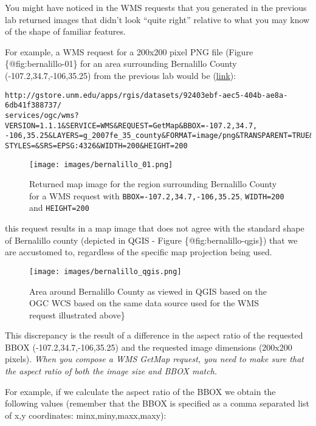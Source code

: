 \documentclass[]{book}
\begin{document}
You might have noticed in the WMS requests that you generated in the
previous lab returned images that didn't look ``quite right'' relative
to what you may know of the shape of familiar features.

For example, a WMS request for a 200x200 pixel PNG file (Figure
\{@fig:bernalillo-01\} for an area surrounding Bernalillo County
(-107.2,34.7,-106,35.25) from the previous lab would be
(\href{http://gstore.unm.edu/apps/rgis/datasets/92403ebf-aec5-404b-ae8a-6db41f388737/services/ogc/wms?VERSION=1.1.1\&SERVICE=WMS\&REQUEST=GetMap\&BBOX=-107.2,34.7,-106,35.25\&LAYERS=g_2007fe_35_county\&FORMAT=image/png\&TRANSPARENT=TRUE\&STYLES=\&SRS=EPSG:4326\&WIDTH=200\&HEIGHT=200}{link}):

\begin{verbatim}
http://gstore.unm.edu/apps/rgis/datasets/92403ebf-aec5-404b-ae8a-6db41f388737/
services/ogc/wms?VERSION=1.1.1&SERVICE=WMS&REQUEST=GetMap&BBOX=-107.2,34.7,
-106,35.25&LAYERS=g_2007fe_35_county&FORMAT=image/png&TRANSPARENT=TRUE&
STYLES=&SRS=EPSG:4326&WIDTH=200&HEIGHT=200
\end{verbatim}

\begin{figure}[htbp]
\centering
\texttt{[image: images/bernalillo\_01.png]}
\caption{Returned map image for the region surrounding Bernalillo County
for a WMS request with \texttt{BBOX=-107.2,34.7,-106,35.25},
\texttt{WIDTH=200} and \texttt{HEIGHT=200}}
\end{figure}

this request results in a map image that does not agree with the
standard shape of Bernalillo county (depicted in QGIS - Figure
\{@fig:bernalillo-qgis\}) that we are accustomed to, regardless of the
specific map projection being used.

\begin{figure}[htbp]
\centering
\texttt{[image: images/bernalillo\_qgis.png]}
\caption{Area around Bernalillo County as viewed in QGIS based on the
OGC WCS based on the same data source used for the WMS request
illustrated above\}}
\end{figure}

This discrepancy is the result of a difference in the aspect ratio of
the requested BBOX (-107.2,34.7,-106,35.25) and the requested image
dimensions (200x200 pixels). \emph{When you compose a WMS GetMap
request, you need to make sure that the aspect ratio of both the image
size and BBOX match.}

For example, if we calculate the aspect ratio of the BBOX we obtain the
following values (remember that the BBOX is specified as a comma
separated list of x,y coordinates: minx,miny,maxx,maxy):
\end{document}

